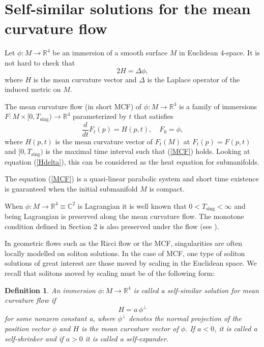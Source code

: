 \documentclass[leqno,11pt]{amsart}
\newtheorem{definition}{Definition}
\begin{document}
\section{Self-similar solutions for the mean curvature flow}

Let $\phi: M\rightarrow {\mathbb{R}}^4$ be an immersion of a smooth surface $M$ in Euclidean 4-space. It is
not hard to check that
\begin{equation}\label{Hdelta}
2H=\Delta \phi,
\end{equation}
where $H$ is the mean curvature vector and $\Delta $ is the Laplace operator of the induced metric
on $M$.

The mean curvature flow (in short MCF) of $\phi: M\rightarrow
{\mathbb{R}}^4$ is a family of immersions $F:M \times [0,T_{\mathrm{sing}})
\rightarrow {\mathbb{R}}^4$ parameterized by $t$ that satisfies
\begin{equation}\label{MCF}
\frac{d}{dt}F_t(p)=H(p,t), \quad F_0=\phi,
\end{equation}
where $H(p,t)$ is the mean curvature vector of $F_t(M)$ at
$F_t(p)=F(p,t)$ and $[0,T_{\mathrm{sing}})$ is the maximal time
interval such that (\ref{MCF}) holds. Looking at equation
(\ref{Hdelta}), this can be considered as the heat equation for
submanifolds.

The equation (\ref{MCF}) is a quasi-linear parabolic system and short time existence is guaranteed
when the initial submanifold $M$ is compact.

When $\phi: M\rightarrow {\mathbb{R}}^4\equiv {\mathbb{C}}^2$ is Lagrangian it is well
known  that $0 < T_{\mathrm{sing}}< \infty$ and being Lagrangian
is preserved along the mean curvature flow. The monotone condition
defined in Section 2 is also preserved under the flow (see
\cite{GSSZ}).

In geometric flows such as the Ricci flow or the MCF, singularities are often locally modelled on
soliton solutions. In the case of MCF, one type of soliton solutions of great interest are those
moved by scaling in the Euclidean space. We recall that solitons moved by scaling must be of the
following form:

\begin{definition}
An immersion $\phi: M\rightarrow {\mathbb{R}}^4$ is called a self-similar solution for mean curvature flow if
\begin{equation}\label{ss}
H=a\, \phi^\perp
\end{equation}
for some nonzero constant a, where $\phi^\perp $ denotes the normal projection of the position
vector $\phi $ and $H$ is the mean curvature vector of $\phi $. If $a<0$, it is called a
self-shrinker and if $a>0$ it is called a self-expander.
\end{definition}
\end{document}
